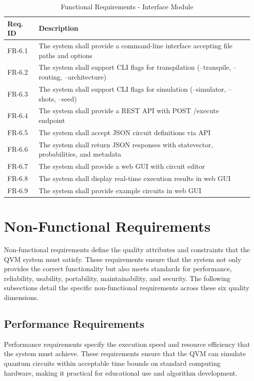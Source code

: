 \begin{table}[H]
\centering
\caption{Functional Requirements - Interface Module}
\begin{tabular}{|p{2cm}|p{11cm}|}
\hline
\textbf{Req. ID} & \textbf{Description} \\
\hline
FR-6.1 & The system shall provide a command-line interface accepting file paths and options \\
\hline
FR-6.2 & The system shall support CLI flags for transpilation (--transpile, --routing, --architecture) \\
\hline
FR-6.3 & The system shall support CLI flags for simulation (--simulator, --shots, --seed) \\
\hline
FR-6.4 & The system shall provide a REST API with POST /execute endpoint \\
\hline
FR-6.5 & The system shall accept JSON circuit definitions via API \\
\hline
FR-6.6 & The system shall return JSON responses with statevector, probabilities, and metadata \\
\hline
FR-6.7 & The system shall provide a web GUI with circuit editor \\
\hline
FR-6.8 & The system shall display real-time execution results in web GUI \\
\hline
FR-6.9 & The system shall provide example circuits in web GUI \\
\hline
\end{tabular}
\end{table}

\section{Non-Functional Requirements}

Non-functional requirements define the quality attributes and constraints that the QVM system must satisfy. These requirements ensure that the system not only provides the correct functionality but also meets standards for performance, reliability, usability, portability, maintainability, and security. The following subsections detail the specific non-functional requirements across these six quality dimensions.

\subsection{Performance Requirements}

Performance requirements specify the execution speed and resource efficiency that the system must achieve. These requirements ensure that the QVM can simulate quantum circuits within acceptable time bounds on standard computing hardware, making it practical for educational use and algorithm development.

